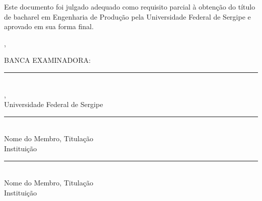 \begin{folhadeaprovacao}
  \begin{center}
    \MakeUppercase{\nomealuno}\par
    \vspace*{1cm}
    {\SingleSpacing\bfseries\MakeUppercase{\titulotrabalho}\ifdefempty{\subtitulotrabalho}{}{: \normalfont\subtitulotrabalho}\par}
    \vspace*{1.7cm}
  \end{center}
  Este documento foi julgado adequado como requisito parcial à obtenção do título de bacharel em Engenharia de Produção pela Universidade Federal de Sergipe e aprovado em sua forma final.
  \begin{center}\vspace{0.8cm}\cidade, \dataaprovacao\end{center}
  \vspace{0.8cm}\noindent BANCA EXAMINADORA:
  \begin{center}
    \vspace*{1.1cm}\rule{8cm}{0.4pt}\\
    \nomeorientador, \titulacaoorientador\\Universidade Federal de Sergipe
    \par\vspace*{1.1cm}\rule{8cm}{0.4pt}\\
    Nome do Membro, Titulação\\Instituição
    \par\vspace*{1.1cm}\rule{8cm}{0.4pt}\\
    Nome do Membro, Titulação\\Instituição
  \end{center}
\end{folhadeaprovacao}
